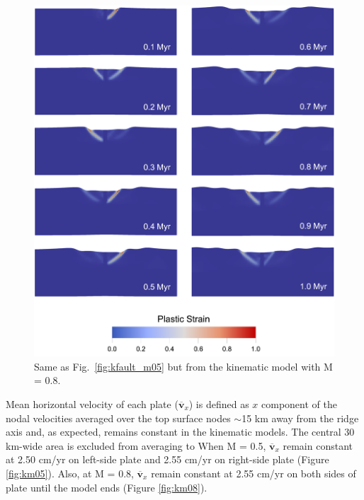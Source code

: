 \documentclass[letterpaper,12pt,notitle]{memphisthesis}                     %
\begin{document}
\begin{figure}[!htb]
	\centering
	\includegraphics[width=0.9\linewidth]{./figs/kfault_m08.png}
	\caption{Same as Fig.~\ref{fig:kfault_m05} but from the kinematic model with M = 0.8.}
	\label{fig:kfault_m08}
\end{figure}

Mean horizontal velocity of each plate ($\overline{\boldsymbol{v}}_{x}$) is defined as $x$ component of the nodal velocities averaged over the top surface nodes $\sim$15 km away from the ridge axis and, as expected, remains constant in the kinematic models. The central 30 km-wide area is excluded from averaging to 
When M = 0.5, $\overline{\boldsymbol{v}}_{x}$ remain constant at 2.50 cm/yr on left-side plate and 2.55 cm/yr on right-side plate (Figure \ref{fig:km05}). Also, at M = 0.8, $\overline{\boldsymbol{v}}_{x}$ remain constant at 2.55 cm/yr on both sides of plate until the model ends (Figure \ref{fig:km08}). 
\end{document}
